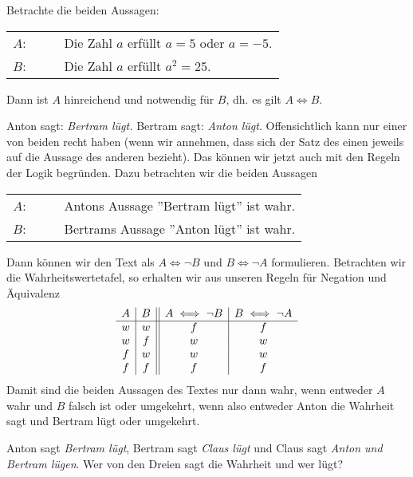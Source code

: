 \begin{beispiel}\label{bsp6aussagen} Betrachte die beiden Aussagen:

\begin{tabular}{r c l}
$A$: & $\quad$ & Die Zahl $a$ erfüllt $a = 5$ oder $a = - 5$. \\
$B$: & $\quad$ & Die Zahl $a$ erfüllt $a^2 = 25$.
\end{tabular}

Dann ist $A$ hinreichend und notwendig für $B$, dh. es gilt $A \iff B$.
\end{beispiel}


\begin{beispiel} Anton sagt: \textit{Bertram lügt.} Bertram sagt: \textit{Anton lügt}. Offensichtlich kann nur 
einer von beiden recht haben (wenn wir annehmen, dass sich der Satz des einen jeweils auf die Aussage 
des anderen bezieht). Das können wir jetzt auch mit den Regeln der Logik begründen. Dazu betrachten wir 
die beiden Aussagen

\begin{tabular}{r c l}
$A$: & $\quad$ & Antons Aussage ''Bertram lügt'' ist wahr. \\
$B$: & $\quad$ & Bertrams Aussage ''Anton lügt'' ist wahr.
\end{tabular}

Dann können wir den Text als $A \iff \neg B$ und $B \iff \neg A$ formulieren. Betrachten wir die 
Wahrheitswertetafel, so erhalten wir aus unseren Regeln für Negation und Äquivalenz
  	$$ \begin{array} { c | c || c | c }
  	A & B & A \iff \neg B & B \iff \neg A \\
  	\hline
  	w & w & f & f \\
  	w & f & w & w \\
  	f & w & w & w \\
  	f & f & f & f 
  	\end{array} $$
Damit sind die beiden Aussagen des Textes nur dann wahr, wenn entweder $A$ wahr und $B$ falsch ist oder umgekehrt, 
wenn also entweder Anton die Wahrheit sagt und Bertram lügt oder umgekehrt.
\end{beispiel}

\begin{aufgabe}\label{logik_aufgabe_1}
Anton sagt \textit{Bertram lügt}, Bertram sagt \textit{Claus lügt} und Claus sagt 
\textit{Anton und Bertram lügen}. Wer von den Dreien sagt die Wahrheit und wer lügt?
\end{aufgabe}

